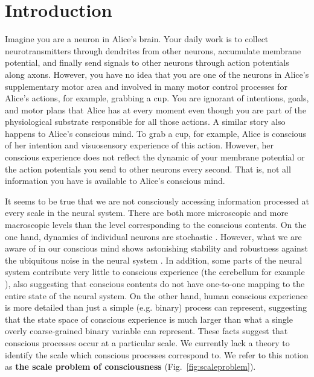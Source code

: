 \documentclass[utf8]{article}
\begin{document}
    \newpage
	\section{Introduction}

		Imagine you are a neuron in Alice's brain. Your daily work is to collect neurotransmitters through dendrites from other neurons, accumulate membrane potential, and finally send signals to other neurons through action potentials along axons. However, you have no idea that you are one of the neurons in Alice's supplementary motor area and involved in many motor control processes for Alice's actions, for example, grabbing a cup. You are ignorant of intentions, goals, and motor plans that Alice has at every moment even though you are part of the physiological substrate responsible for all those actions.
		A similar story also happens to Alice's conscious mind. To grab a cup, for example, Alice is conscious of her intention and visuosensory experience of this action. However, her conscious experience does not reflect the dynamic of your membrane potential or the action potentials you send to other neurons every second. That is, not all information you have is available to Alice's conscious mind.

		
		It seems to be true that we are not consciously accessing information processed at every scale in the neural system. There are both more microscopic and more macroscopic levels than the level corresponding to the conscious contents. On the one hand, dynamics of individual neurons are stochastic \citep{Goldwyn2011, White2000}. However, what we are aware of in our conscious mind shows astonishing stability and robustness against the ubiquitous noise in the neural system \citep{mathis1995computational}. In addition, some parts of the neural system contribute very little to conscious experience (the cerebellum for example \citep{lemon2010life}), also suggesting that conscious contents do not have one-to-one mapping to the entire state of the neural system. On the other hand, human conscious experience is more detailed than just a simple (e.g. binary) process can represent, suggesting that the state space of conscious experience is much larger than what a single overly coarse-grained binary variable can represent. These facts suggest that conscious processes occur at a particular scale. We currently lack a theory to identify the scale which conscious processes correspond to. We refer to this notion as \textbf{the scale problem of consciousness} (Fig.~\ref{fig:scaleproblem}).
\end{document}
